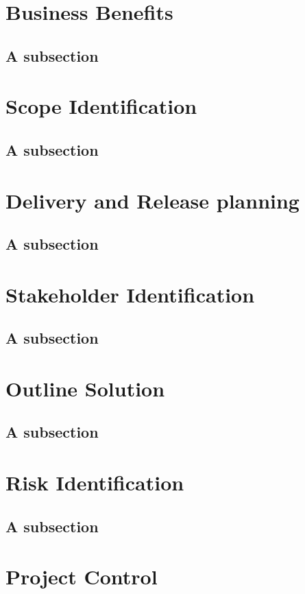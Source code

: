 \documentclass[11pt]{article} %
\begin{document}
\section{Business Benefits}
\subsection{A subsection}

\section{Scope Identification}
\subsection{A subsection}

\section{Delivery and Release planning}
\subsection{A subsection}

\section{Stakeholder Identification}
\subsection{A subsection}

\section{Outline Solution}
\subsection{A subsection}

\section{Risk Identification}
\subsection{A subsection}

\section{Project Control}
\end{document}
